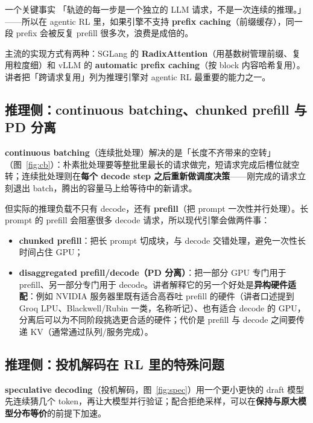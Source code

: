 \documentclass[a4paper]{article}
\begin{document}
\begin{importantbox}{一个关键事实}
「轨迹的每一步是一个独立的 LLM 请求，不是一次连续的推理。」——所以在 agentic RL 里，如果引擎不支持 \textbf{prefix caching}（前缀缓存），同一段 prefix 会被反复 prefill 很多次，浪费是成倍的。
\end{importantbox}

主流的实现方式有两种：SGLang 的 \textbf{RadixAttention}（用基数树管理前缀、复用粒度细）和 vLLM 的 \textbf{automatic prefix caching}（按 block 内容哈希复用）。讲者把「跨请求复用」列为推理引擎对 agentic RL 最重要的能力之一。

\subsection{推理侧：continuous batching、chunked prefill 与 PD 分离}

\textbf{continuous batching}（连续批处理）解决的是「长度不齐带来的空转」（图~\ref{fig:cb}）：朴素批处理要等整批里最长的请求做完，短请求完成后槽位就空转；连续批处理则在\textbf{每个 decode step 之后重新做调度决策}——刚完成的请求立刻退出 batch，腾出的容量马上给等待中的新请求。

但实际的推理负载不只有 decode，还有 \textbf{prefill}（把 prompt 一次性并行处理）。长 prompt 的 prefill 会阻塞很多 decode 请求，所以现代引擎会做两件事：

\begin{itemize}
\item \textbf{chunked prefill}：把长 prompt 切成块，与 decode 交错处理，避免一次性长时间占住 GPU；
\item \textbf{disaggregated prefill/decode（PD 分离）}：把一部分 GPU 专门用于 prefill、另一部分专门用于 decode。讲者解释它的另一个好处是\textbf{异构硬件适配}：例如 NVIDIA 服务器里既有适合高吞吐 prefill 的硬件（讲者口述提到 Groq LPU、Blackwell/Rubin 一类，名称听记）、也有适合 decode 的 GPU，分离后可以为不同阶段挑选更合适的硬件；代价是 prefill 与 decode 之间要传递 KV（通常通过队列/服务完成）。
\end{itemize}

\subsection{推理侧：投机解码在 RL 里的特殊问题}

\textbf{speculative decoding}（投机解码，图~\ref{fig:spec}）用一个更小更快的 draft 模型先连续猜几个 token，再让大模型并行验证；配合拒绝采样，可以在\textbf{保持与原大模型分布等价}的前提下加速。
\end{document}
